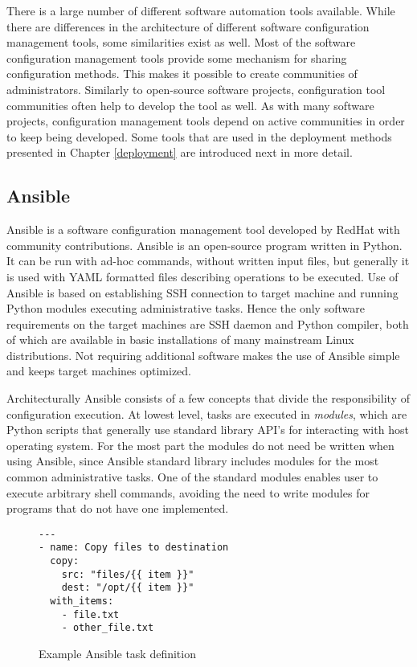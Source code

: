 There is a large number of different software automation tools available. While
there are differences in the architecture of different software configuration
management tools, some similarities exist as well. Most of the software
configuration management tools provide some mechanism for sharing configuration
methods. This makes it possible to create communities of administrators.
Similarly to open-source software projects, configuration tool communities
often help to develop the tool as well. As with many software projects,
configuration management tools depend on active communities in order to keep
being developed. Some tools that are used in the deployment methods presented
in Chapter \ref{deployment} are introduced next in more detail.

\subsection{Ansible}

Ansible \cite{ansible} is a software configuration management tool developed by
RedHat with community contributions. Ansible is an open-source program written
in Python. It can be run with ad-hoc commands, without written input files, but
generally it is used with YAML formatted files describing operations to be
executed. Use of Ansible is based on establishing SSH connection to target
machine and running Python modules executing administrative tasks. Hence the
only software requirements on the target machines are SSH daemon and Python
compiler, both of which are available in basic installations of many mainstream
Linux distributions. Not requiring additional software makes the use of Ansible
simple and keeps target machines optimized.

Architecturally Ansible consists of a few concepts that divide the
responsibility of configuration execution. At lowest level, tasks are executed
in \textit{modules}, which are Python scripts that generally use standard
library API's for interacting with host operating system. For the most part the
modules do not need be written when using Ansible, since Ansible standard
library includes modules for the most common administrative tasks. One of the
standard modules enables user to execute arbitrary shell commands, avoiding the
need to write modules for programs that do not have one implemented.

\begin{figure}[t]
\centering
\begin{verbatim}
---
- name: Copy files to destination
  copy:
    src: "files/{{ item }}"
    dest: "/opt/{{ item }}"
  with_items:
    - file.txt
    - other_file.txt
\end{verbatim}

\caption{Example Ansible task definition}
\label{fig:ansible-task}
\end{figure}

